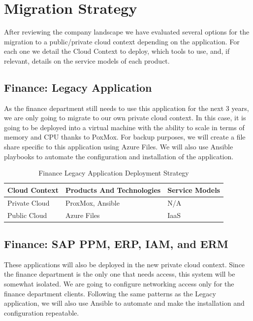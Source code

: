 \documentclass{llncs}
\begin{document}
\section{Migration Strategy}

After reviewing the company landscape we have evaluated several options for the migration to a public/private cloud context depending on the application.
For each one we detail the Cloud Context to deploy, which tools to use, and, if relevant, details on the service models of each product.

\subsection{Finance: Legacy Application}

As the finance department still needs to use this application for the next 3 years, we are only going to migrate to our own private cloud context.
In this case, it is going to be deployed into a virtual machine with the ability to scale in terms of memory and CPU thanks to PoxMox.
For backup purposes, we will create a file share specific to this application using Azure Files.
We will also use Ansible playbooks to automate the configuration and installation of the application.\\

\begin{table}[h!]
    \centering
    \begin{tabular}{lll}
        \hline
        \textbf{Cloud Context} & \textbf{Products And Technologies} & \textbf{Service Models} \\
        \hline
 Private Cloud          & ProxMox, Ansible                   & N/A                     \\
        \hline
 Public Cloud           & Azure Files                        & IaaS                    \\
        \hline
    \end{tabular}
    \caption{Finance Legacy Application Deployment Strategy}
\end{table}


\subsection{Finance: SAP PPM, ERP, IAM, and ERM}
These applications will also be deployed in the new private cloud context.
Since the finance department is the only one that needs access, this system will be somewhat isolated.
We are going to configure networking access only for the finance department clients.
Following the same patterns as the Legacy application, we will also use Ansible to automate and make the installation and configuration repeatable.\\
\end{document}
